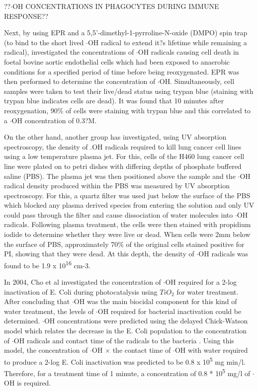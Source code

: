 \documentclass[11pt, oneside]{article}   	%
\begin{document}
??$\cdot$OH CONCENTRATIONS IN PHAGOCYTES DURING IMMUNE RESPONSE??

Next, by using EPR and a 5,5'-dimethyl-1-pyrroline-N-oxide (DMPO) spin trap (to bind to the short lived $\cdot$OH radical to extend it?s lifetime while remaining a radical), \cite{Zweier1988} investigated the concentrations of $\cdot$OH radicals causing cell death in foetal bovine aortic endothelial cells which had been exposed to anaerobic conditions for a specified period of time before being reoxygenated. EPR was then performed to determine the concentration of $\cdot$OH. Simultaneously, cell samples were taken to test their live/dead status using trypan blue (staining with trypan blue indicates cells are dead). It was found that 10 minutes after reoxygenation, 90\% of cells were staining with trypan blue and this correlated to a $\cdot$OH concentration of 0.3?M. 

On the other hand, another group \cite{Attri2015} has investigated, using UV absorption spectroscopy, the density of .OH radicals required to kill lung cancer cell lines using a low temperature plasma jet. For this, cells of the H460 lung cancer cell line were plated on to petri dishes with differing depths of phosphate buffered saline (PBS). The plasma jet was then positioned above the sample and the $\cdot$OH radical density produced within the PBS was measured by UV absorption spectroscopy. For this, a quartz filter was used just below the surface of the PBS which blocked any plasma derived species from entering the solution and only UV could pass through the filter and cause dissociation of water molecules into $\cdot$OH radicals. Following plasma treatment, the cells were then stained with propidium iodide to determine whether they were live or dead. When cells were 2mm below the surface of PBS, approximately 70\% of the original cells stained positive for PI, showing that they were dead.  At this depth, the density of $\cdot$OH radicals was found to be 1.9 x 10\textsuperscript{16} cm-3.  

In 2004, Cho et al \cite{Cho2004} investigated the concentration of $\cdot$OH required for a 2-log inactivation of E. Coli during photocatalysis using $TiO_2$ for water treatment. After concluding that $\cdot$OH was the main biocidal component for this kind of water treatment, the levels of $\cdot$OH required for bacterial inactivation could be determined.
$\cdot$OH concentrations were predicted using the delayed Chick-Watson model which relates the decrease in the E. Coli population to the concentration of $\cdot$OH radicals and contact time of the radicals to the bacteria \cite{Cho2003}. Using this model, the concentration of $\cdot$OH $\times$ the contact time of $\cdot$OH with water required to produce a 2-log E. Coli inactivation was predicted to be 0.8 x 10\textsuperscript{5} mg min/l.  Therefore, for a treatment time of 1 minute, a concentration of 0.8 * 10\textsuperscript{5} mg/l of $\cdot$OH is required. 
\end{document}
